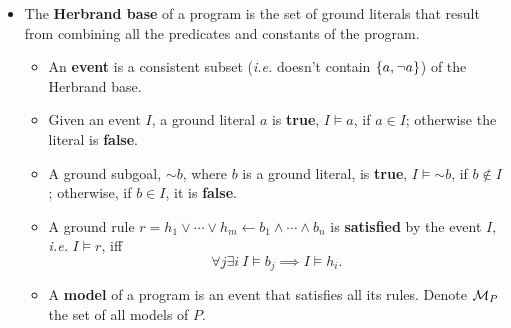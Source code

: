 \documentclass{beamer}
\newcommand{\naf}{\ensuremath{\sim\!}}
\newcommand{\fml}[1]{\ensuremath{{\cal #1}}}
\newcommand{\deft}[1]{\textbf{#1}}
\begin{document}
\begin{frame}
\begin{itemize}
        \item The \deft{Herbrand base} of a program is the set of ground literals that result from combining all the predicates and constants of the program.     
        \begin{itemize}
            \item An \deft{event} is a consistent subset (\emph{i.e.} doesn't contain $\set{a, \neg a}$) of the Herbrand base.
            \item Given an event $I$, a ground literal $a$ is \deft{true}, $I \models a$, if $a \in I$; otherwise the literal is \deft{false}.
            \item A ground subgoal, $\naf b$, where $b$ is a ground literal, is \deft{true}, $I \models \naf b$, if $b \not\in I$; otherwise, if $b \in I$,  it is \deft{false}.
            \item A ground rule $r = h_1 \vee \cdots \vee h_m \leftarrow b_1 \wedge \cdots \wedge b_n$ is \deft{satisfied} by the event $I$, \emph{i.e.} $I \models r$, iff 
            $$
            \forall j \exists i~I \models b_j \implies I \models h_i.
            $$
            \item A \deft{model} of a program is an event that satisfies all its rules. Denote $\fml{M}_P$ the set of all models of $P$.
        \end{itemize}
        

\end{itemize}
\end{frame}
\end{document}
